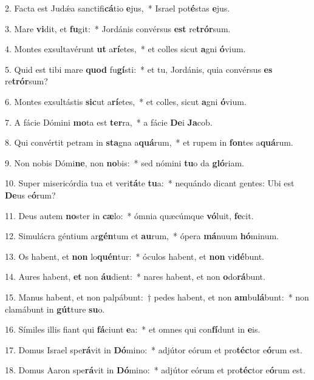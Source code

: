 \item 2. Facta est Judǽa sanctifi\textbf{cá}tio \textbf{e}jus,~* Israel pot\textbf{é}stas \textbf{e}jus.
\item 3. Mare \textbf{vi}dit, et \textbf{fu}git:~* Jordánis convérsus \textbf{est} re\textbf{trór}sum.
\item 4. Montes exsultavérunt \textbf{ut} a\textbf{rí}etes,~* et colles sicut \textbf{a}gni \textbf{ó}vium.
\item 5. Quid est tibi mare \textbf{quod} fu\textbf{gí}sti:~* et tu, Jordánis, quia convérsus \textbf{es} re\textbf{trór}sum?
\item 6. Montes exsultástis \textbf{sic}ut a\textbf{rí}etes,~* et colles, sicut \textbf{a}gni \textbf{ó}vium.
\item 7. A fácie Dómini \textbf{mo}ta est \textbf{ter}ra,~* a fácie \textbf{De}i \textbf{Ja}cob.
\item 8. Qui convértit petram in \textbf{sta}gna a\textbf{quá}rum,~* et rupem in \textbf{fon}tes a\textbf{quá}rum.
\item 9. Non nobis Dómi\textbf{ne}, non \textbf{no}bis:~* sed nómini \textbf{tu}o da \textbf{gló}riam.
\item 10. Super misericórdia tua et veri\textbf{tá}te \textbf{tu}a:~* nequándo dicant gentes: Ubi est \textbf{De}us e\textbf{ó}rum?
\item 11. Deus autem \textbf{no}ster in \textbf{cæ}lo:~* ómnia quæcúmque \textbf{vó}luit, \textbf{fe}cit.
\item 12. Simulácra géntium ar\textbf{gén}tum et \textbf{au}rum,~* ópera \textbf{má}nuum \textbf{hó}minum.
\item 13. Os habent, et \textbf{non} lo\textbf{quén}tur:~* óculos habent, et \textbf{non} vi\textbf{dé}bunt.
\item 14. Aures habent, \textbf{et} non \textbf{áu}dient:~* nares habent, et non \textbf{o}do\textbf{rá}bunt.
\item 15. Manus habent, et non palpábunt:~† pedes habent, et non \textbf{am}bu\textbf{lá}bunt:~* non clamábunt in \textbf{gút}ture \textbf{su}o.
\item 16. Símiles illis fiant qui \textbf{fá}ciunt \textbf{e}a:~* et omnes qui con\textbf{fí}dunt in \textbf{e}is.
\item 17. Domus Israel spe\textbf{rá}vit in \textbf{Dó}mino:~* adjútor eórum et pro\textbf{téc}tor e\textbf{ó}rum est.
\item 18. Domus Aaron spe\textbf{rá}vit in \textbf{Dó}mino:~* adjútor eórum et pro\textbf{téc}tor e\textbf{ó}rum est.
